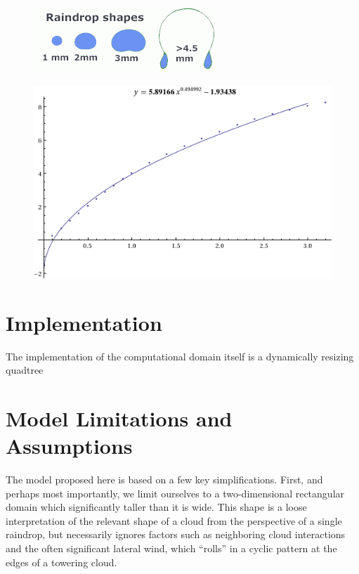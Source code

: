 \documentclass[twocolumn,a4paper,10pt]{article}
\begin{document}
\begin{figure}[h]
    \centering
    \includegraphics[width=0.75\linewidth]{raindrop_shapes}
    \caption{}
    \label{fig:raindrop}
\end{figure}
\begin{figure}[t]
    \centering
    \includegraphics[width=0.75\linewidth]{terminal_velocity}
    \caption{}
    \label{fig:velocity}
\end{figure}


\section{Implementation}

The implementation of the computational domain itself is a dynamically resizing
quadtree


\section{Model Limitations and Assumptions}

The model proposed here is based on a few key simplifications. First, and
perhaps most importantly, we limit ourselves to a two-dimensional rectangular
domain which significantly taller than it is wide. This shape is a loose
interpretation of the relevant shape of a cloud from the perspective of a single
raindrop, but necessarily ignores factors such as neighboring cloud
interactions and the often significant lateral wind, which ``rolls'' in a cyclic
pattern at the edges of a towering cloud.
\end{document}
